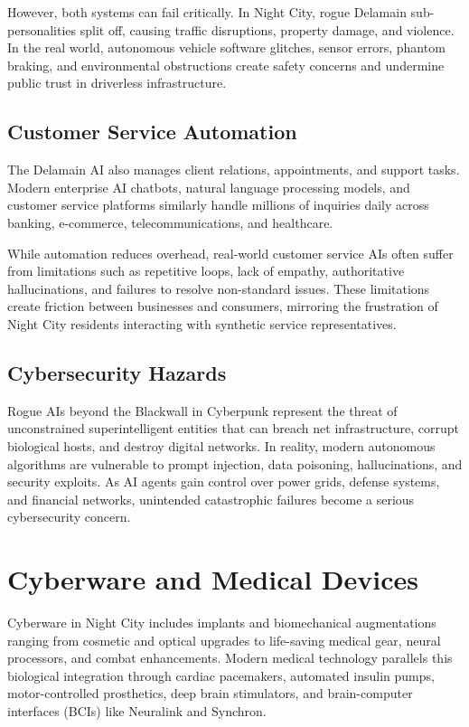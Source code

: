 \documentclass{article}%
\begin{document}
However, both systems can fail critically. In Night City, rogue Delamain sub-personalities split off, causing traffic disruptions, property damage, and violence. In the real world, autonomous vehicle software glitches, sensor errors, phantom braking, and environmental obstructions create safety concerns and undermine public trust in driverless infrastructure.

\subsection{Customer Service Automation}
The Delamain AI also manages client relations, appointments, and support tasks. Modern enterprise AI chatbots, natural language processing models, and customer service platforms similarly handle millions of inquiries daily across banking, e-commerce, telecommunications, and healthcare.

While automation reduces overhead, real-world customer service AIs often suffer from limitations such as repetitive loops, lack of empathy, authoritative hallucinations, and failures to resolve non-standard issues. These limitations create friction between businesses and consumers, mirroring the frustration of Night City residents interacting with synthetic service representatives.

\subsection{Cybersecurity Hazards}
Rogue AIs beyond the Blackwall in Cyberpunk represent the threat of unconstrained superintelligent entities that can breach net infrastructure, corrupt biological hosts, and destroy digital networks. In reality, modern autonomous algorithms are vulnerable to prompt injection, data poisoning, hallucinations, and security exploits. As AI agents gain control over power grids, defense systems, and financial networks, unintended catastrophic failures become a serious cybersecurity concern.

\section{Cyberware and Medical Devices}
Cyberware in Night City includes implants and biomechanical augmentations ranging from cosmetic and optical upgrades to life-saving medical gear, neural processors, and combat enhancements. Modern medical technology parallels this biological integration through cardiac pacemakers, automated insulin pumps, motor-controlled prosthetics, deep brain stimulators, and brain-computer interfaces (BCIs) like Neuralink and Synchron.
\end{document}
